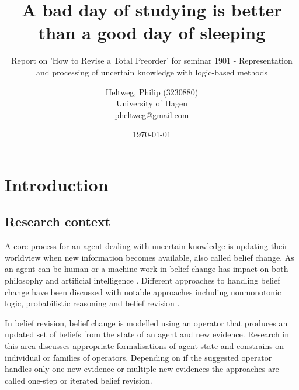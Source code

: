 \documentclass[11pt]{scrartcl}
\theoremstyle{definition}
\begin{document}
\title{A bad day of studying is better than a good day of sleeping}
\subtitle{Report on 'How to Revise a Total Preorder' \cite{Booth2011} for seminar 1901 - Representation and processing of uncertain knowledge with logic-based methods}
\author{
	Heltweg, Philip (3230880) \\
	University of Hagen \\
	pheltweg@gmail.com
}
\date{\today}
\maketitle


\newpage

\tableofcontents

\newpage

\section{Introduction}



\subsection{Research context}
A core process for an agent dealing with uncertain knowledge is updating their worldview when new information becomes available, also called belief change. As an agent can be human or a machine work in belief change has impact on both philosophy and artificial intelligence \cite{Ferme2011}. Different approaches to handling belief change have been discussed with notable approaches including nonmonotonic logic, probabilistic reasoning and belief revision \cite{Darwiche1997}.

In belief revision, belief change is modelled using an operator that produces an updated set of beliefs from the state of an agent and new evidence. Research in this area discusses appropriate formalisations of agent state and constrains on individual or families of operators. Depending on if the suggested operator handles only one new evidence or multiple new evidences the approaches are called one-step or iterated belief revision.
\end{document}
